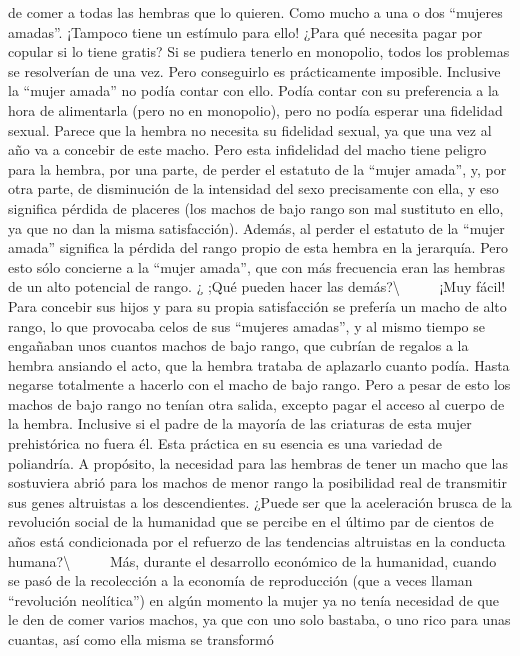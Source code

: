 de comer a todas las hembras que lo quieren. Como mucho a una o dos
``mujeres amadas''. ¡Tampoco tiene un estímulo para ello! ¿Para qué
necesita pagar por copular si lo tiene gratis? Si se pudiera tenerlo en
monopolio, todos los problemas se resolverían de una vez. Pero
conseguirlo es prácticamente imposible. Inclusive la ``mujer amada'' no
podía contar con ello. Podía contar con su preferencia a la hora de
alimentarla (pero no en monopolio), pero no podía esperar una fidelidad
sexual. Parece que la hembra no necesita su fidelidad sexual, ya que una
vez al año va a concebir de este macho. Pero esta infidelidad del macho
tiene peligro para la hembra, por una parte, de perder el estatuto de la
``mujer amada'', y, por otra parte, de disminución de la intensidad del
sexo precisamente con ella, y eso significa pérdida de placeres (los
machos de bajo rango son mal sustituto en ello, ya que no dan la misma
satisfacción). Además, al perder el estatuto de la ``mujer amada''
significa la pérdida del rango propio de esta hembra en la jerarquía.
Pero esto sólo concierne a la ``mujer amada'', que con más frecuencia
eran las hembras de un alto potencial de rango. ¿ ;Qué pueden hacer las
demás?\textbackslash{} ~ ~ ~ ¡Muy fácil! Para concebir sus hijos y para
su propia satisfacción se prefería un macho de alto rango, lo que
provocaba celos de sus ``mujeres amadas'', y al mismo tiempo se
engañaban unos cuantos machos de bajo rango, que cubrían de regalos a la
hembra ansiando el acto, que la hembra trataba de aplazarlo cuanto
podía. Hasta negarse totalmente a hacerlo con el macho de bajo rango.
Pero a pesar de esto los machos de bajo rango no tenían otra salida,
excepto pagar el acceso al cuerpo de la hembra. Inclusive si el padre de
la mayoría de las criaturas de esta mujer prehistórica no fuera él. Esta
práctica en su esencia es una variedad de poliandría. A propósito, la
necesidad para las hembras de tener un macho que las sostuviera abrió
para los machos de menor rango la posibilidad real de transmitir sus
genes altruistas a los descendientes. ¿Puede ser que la aceleración
brusca de la revolución social de la humanidad que se percibe en el
último par de cientos de años está condicionada por el refuerzo de las
tendencias altruistas en la conducta humana?\textbackslash{} ~ ~ ~ Más,
durante el desarrollo económico de la humanidad, cuando se pasó de la
recolección a la economía de reproducción (que a veces llaman
``revolución neolítica'') en algún momento la mujer ya no tenía
necesidad de que le den de comer varios machos, ya que con uno solo
bastaba, o uno rico para unas cuantas, así como ella misma se transformó
